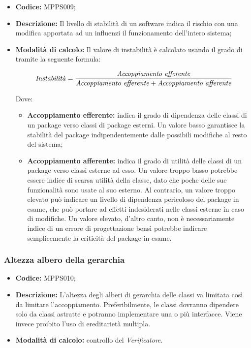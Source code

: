 \documentclass[../NormediProgetto.tex]{subfiles}
\begin{document}
\begin{itemize}
	\item \textbf{Codice:} MPPS009;
	
	\item \textbf{Descrizione:} Il livello di stabilità di un software indica il rischio con una modifica apportata ad un  influenzi il funzionamento dell'intero sistema;
	
	\item \textbf{Modalità di calcolo:} Il valore di instabilità è calcolato usando il grado di  tramite la seguente formula:
	
	\[ \textrm{\textit{Instabilità}} = \frac{\textrm{\textit{Accoppiamento efferente}}}{\textrm{\textit{Accoppiamento efferente}} + \textrm{\textit{Accoppiamento afferente}}} \]
	
	Dove:
	
	\begin{itemize}
		\item \textbf{Accoppiamento efferente:} indica il grado di dipendenza delle classi di un package verso classi di package esterni. Un valore basso garantisce la stabilità del package indipendentemente dalle possibili modifiche al resto del sistema;
		
		\item \textbf{Accoppiamento afferente:} indica il grado di utilità delle classi di un package verso classi esterne ad esso. Un valore troppo basso potrebbe essere indice di scarsa utilità della classe, dato che poche delle sue funzionalità sono usate al suo esterno. Al contrario, un valore troppo elevato può indicare un livello di dipendenza pericoloso del package in esame, che può portare ad effetti indesiderati nelle classi esterne in caso di modifiche. Un valore elevato, d'altro canto, non è necessariamente indice di un errore di progettazione bensì potrebbe indicare semplicemente la criticità del package in esame.
	\end{itemize}
	
\end{itemize}

\subsubsection{Altezza albero della gerarchia}

\begin{itemize}
	
	\item \textbf{Codice:} MPPS010;
	
	\item \textbf{Descrizione:} L'altezza degli alberi di gerarchia delle classi va limitata così da limitare l'accoppiamento. Preferibilmente, le classi dovranno dipendere solo da classi astratte e potranno implementare una o più interfacce. Viene invece proibito l'uso di ereditarietà multipla.
	
	\item \textbf{Modalità di calcolo:} controllo del \textit{Verificatore}.
\end{itemize}
\end{document}
